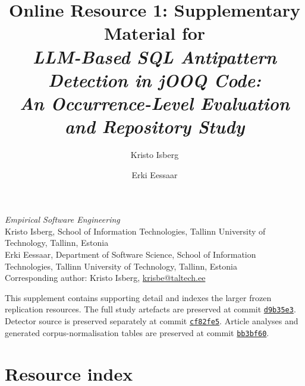 \documentclass[a4paper,11pt]{article}
\title{Online Resource 1: Supplementary Material for\\
\emph{LLM-Based SQL Antipattern Detection in jOOQ Code:\\
An Occurrence-Level Evaluation and Repository Study}}
\author{Kristo Isberg \and Erki Eessaar}
\date{}
\begin{document}
\maketitle

\begin{center}
\emph{Empirical Software Engineering}\\[0.5em]
Kristo Isberg, School of Information Technologies, Tallinn University of Technology, Tallinn, Estonia\\
Erki Eessaar, Department of Software Science, School of Information Technologies, Tallinn University of Technology, Tallinn, Estonia\\
Corresponding author: Kristo Isberg, \href{mailto:krisbe@taltech.ee}{krisbe@taltech.ee}
\end{center}

This supplement contains supporting detail and indexes the larger frozen replication resources. The full study artefacts are preserved at commit \href{https://github.com/kristoisberg/masters-thesis/tree/d9b35e398a6deb544f913bdbc0b211ab38474a44}{\texttt{d9b35e3}}. Detector source is preserved separately at commit \href{https://github.com/kristoisberg/jooq-antipattern-detector/tree/cf82fe56acb728f076df67279ff4a78a138996f3}{\texttt{cf82fe5}}. Article analyses and generated corpus-normalisation tables are preserved at commit \href{https://github.com/kristoisberg/thesis-paper/tree/bb3bf6056cc7bbda29bb0fb5f0b720e7f9d06028/analysis}{\texttt{bb3bf60}}.

\section{Resource index}
\end{document}
